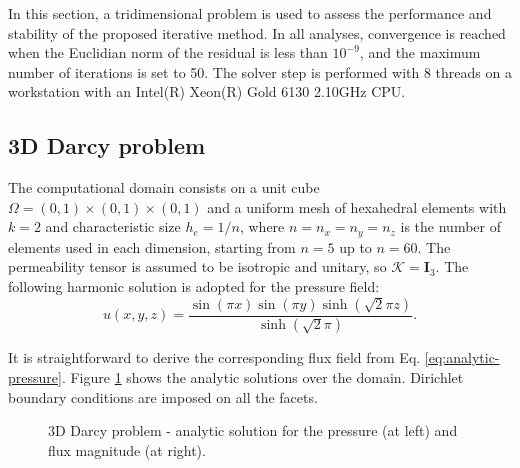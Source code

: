 \documentclass{wccm2024}
\begin{document}
In this section, a tridimensional problem is used to assess the performance and stability of the proposed iterative method. In all analyses, convergence is reached when the Euclidian norm of the residual is less than $10^{-9}$, and the maximum number of iterations is set to 50. The solver step is performed with 8 threads on a workstation with an Intel(R) Xeon(R) Gold 6130 2.10GHz CPU.

\subsection{3D Darcy problem}

The computational domain consists on a unit cube $\Omega=(0,1)\times(0,1)\times(0,1)$ and a uniform mesh of hexahedral elements with $k=2$ and characteristic size $h_e=1/n$, where $n=n_x=n_y=n_z$ is the number of elements used in each dimension, starting from $n=5$ up to $n=60$.  The permeability tensor is assumed to be isotropic and unitary, so $\mathcal{K}=\mathbf{I}_3$. The following harmonic solution is adopted for the pressure field:
\vskip -0.3cm
\begin{equation} \label{eq:analytic-pressure}
    u(x,y,z) = \frac{\sin(\pi x) \sin(\pi y) \sinh(\sqrt{2}\pi z)}{\sinh(\sqrt{2}\pi)} \text{.}
\end{equation}

It is straightforward to derive the corresponding flux field from Eq. \eqref{eq:analytic-pressure}. Figure \ref{fig:analytic-solutions} shows the analytic solutions over the domain. Dirichlet boundary conditions are imposed on all the facets.

\begin{figure}[!ht]
    \centering
     \hfill
    \caption{3D Darcy problem - analytic solution for the pressure (at left) and flux magnitude (at right).}
    \label{fig:analytic-solutions}
\end{figure}
\end{document}
